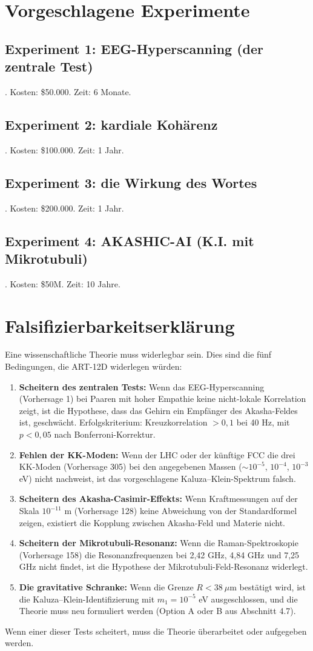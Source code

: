 \documentclass[11pt,a4paper]{article}
\begin{document}
\section{Vorgeschlagene Experimente}
\subsection{Experiment 1: EEG-Hyperscanning (der zentrale Test)}. Kosten: \$50.000. Zeit: 6 Monate.
\subsection{Experiment 2: kardiale Kohärenz}. Kosten: \$100.000. Zeit: 1 Jahr.
\subsection{Experiment 3: die Wirkung des Wortes}. Kosten: \$200.000. Zeit: 1 Jahr.
\subsection{Experiment 4: AKASHIC-AI (K.I. mit Mikrotubuli)}. Kosten: \$50M. Zeit: 10 Jahre.

\section{Falsifizierbarkeitserklärung}
Eine wissenschaftliche Theorie muss widerlegbar sein. Dies sind die fünf Bedingungen, die ART-12D widerlegen würden:
\begin{enumerate}
    \item \textbf{Scheitern des zentralen Tests:} Wenn das EEG-Hyperscanning (Vorhersage 1) bei Paaren mit hoher Empathie keine nicht-lokale Korrelation zeigt, ist die Hypothese, dass das Gehirn ein Empfänger des Akasha-Feldes ist, geschwächt. Erfolgskriterium: Kreuzkorrelation $> 0,1$ bei 40 Hz, mit $p < 0,05$ nach Bonferroni-Korrektur.
    \item \textbf{Fehlen der KK-Moden:} Wenn der LHC oder der künftige FCC die drei KK-Moden (Vorhersage 305) bei den angegebenen Massen ($\sim 10^{-5}$, $10^{-4}$, $10^{-3}$ eV) nicht nachweist, ist das vorgeschlagene Kaluza--Klein-Spektrum falsch.
    \item \textbf{Scheitern des Akasha-Casimir-Effekts:} Wenn Kraftmessungen auf der Skala $10^{-11}$ m (Vorhersage 128) keine Abweichung von der Standardformel zeigen, existiert die Kopplung zwischen Akasha-Feld und Materie nicht.
    \item \textbf{Scheitern der Mikrotubuli-Resonanz:} Wenn die Raman-Spektroskopie (Vorhersage 158) die Resonanzfrequenzen bei 2,42 GHz, 4,84 GHz und 7,25 GHz nicht findet, ist die Hypothese der Mikrotubuli-Feld-Resonanz widerlegt.
    \item \textbf{Die gravitative Schranke:} Wenn die Grenze $R < 38\ \mu$m bestätigt wird, ist die Kaluza--Klein-Identifizierung mit $m_1 = 10^{-5}$ eV ausgeschlossen, und die Theorie muss neu formuliert werden (Option A oder B aus Abschnitt 4.7).
\end{enumerate}
Wenn einer dieser Tests scheitert, muss die Theorie überarbeitet oder aufgegeben werden.
\end{document}
